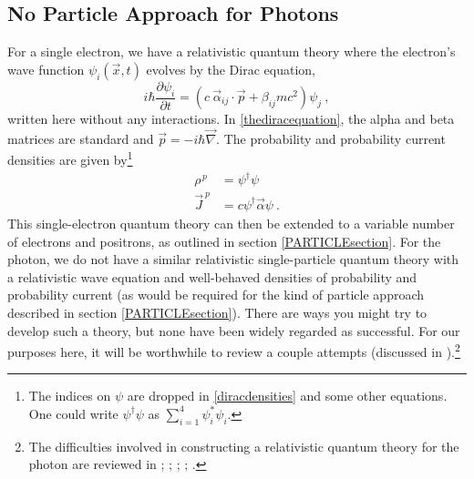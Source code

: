 \documentclass[onecolumn,secnumarabic,amsmath,amssymb,balancelastpage,nofootinbib,12pt]{article}
\newcommand{\del}[0]{\ensuremath{\vec{\nabla}}}
\begin{document}
\subsection{No Particle Approach for Photons}\label{PHOTONSsection}

For a single electron, we have a relativistic quantum theory where the electron's wave function $\psi_i(\vec{x},t)$ evolves by the Dirac equation,
\begin{equation}
i\hbar \frac{\partial \psi_i}{\partial t}=\left(c\:\vec{\alpha}_{ij}\cdot\vec{p}+\beta_{ij} m c^2 \right)\psi_j
\ ,
\label{thediracequation}
\end{equation}
written here without any interactions.  In \eqref{thediracequation}, the alpha and beta matrices are standard and $\vec{p}=-i\hbar\del$.  The probability and probability current densities are given by\footnote{The indices on $\psi$ are dropped in \eqref{diracdensities} and some other equations.  One could write $\psi^\dagger \psi$ as $\sum_{i=1}^4 \psi_i^*\psi_i$.}
\begin{align}
\rho^{\,p}&=\psi^\dagger \psi
\nonumber
\\
\vec{J}^{\:p}&=c \psi^\dagger \vec{\alpha} \psi
\ .
\label{diracdensities}
\end{align}
This single-electron quantum theory can then be extended to a variable number of electrons and positrons, as outlined in section \ref{PARTICLEsection}.  For the photon, we do not have a similar relativistic single-particle quantum theory with a relativistic wave equation and well-behaved densities of probability and probability current (as would be required for the kind of particle approach described in section \ref{PARTICLEsection}).  There are ways you might try to develop such a theory, but none have been widely regarded as successful.  For our purposes here, it will be worthwhile to review a couple attempts (discussed in \citealp{emasqp}).\footnote{The difficulties involved in constructing a relativistic quantum theory for the photon are reviewed in \citet[sec.\ II.5.2]{bohm1987}; \citet{holland1993}; \citet[sec.\ 12.6]{holland}; \citet{kiessling2018}; \citet[sec.\ 7.4]{valentini2020}.}
\end{document}

